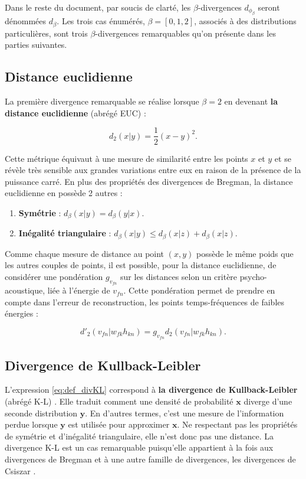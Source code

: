 Dans le reste du document, par soucis de clarté, les $\beta$-divergences $d_{\phi_{\beta}}$ seront dénommées $d_{\beta}$. Les trois cas énumérés, $\beta  = [0,1,2]$, associés à des distributions particulières, sont trois $\beta$-divergences remarquables qu'on présente dans les parties suivantes.

\subsection{Distance euclidienne}
La première divergence remarquable se réalise lorsque $\beta = 2$ en devenant \textbf{la distance euclidienne} (abrégé EUC) :

\begin{equation}
d_{{2}}(x\vert y) = \dfrac{1}{2}(x-y)^2.
\end{equation}

Cette métrique équivaut à une mesure de similarité entre les points $x$ et $y$ et se révèle très sensible aux grandes variations entre eux en raison de la présence de la puissance carré. En plus des propriétés des divergences de Bregman, la distance euclidienne en possède 2 autres :
\begin{enumerate}

\item \textbf{Symétrie} : $d_{\beta}(x \vert y ) = d_{\beta}(y \vert x)$.

\item \textbf{Inégalité triangulaire} : $d_{\beta}(x \vert y ) \leq d_{\beta}(x \vert z ) + d_{\beta}(x \vert z )$.\\
\end{enumerate}

Comme chaque mesure de distance au point $(x,y)$ possède le même poids que les autres couples de points, il est possible, pour la distance euclidienne, de considérer une pondération $g_{v_{fn}}$  sur les distances selon un critère psycho-acoustique, liée à l'énergie de $v_{fn}$. Cette pondération permet de prendre en compte dans l'erreur de reconstruction, les points temps-fréquences de faibles énergies \cite{virtanen2004separation} :

\begin{equation}
d'_2(v_{fn} \vert w_{fk} h_{kn}) = g_{v_{fn}} d_2 (v_{fn} \vert w_{fk} h_{kn}).
\end{equation}

\subsection{Divergence de Kullback-Leibler}
L'expression \ref{eq:def_divKL} correspond à \textbf{la divergence de Kullback-Leibler} (abrégé K-L) \cite{kompass_generalized_2007, cichocki_new_2006} . Elle traduit comment une densité de probabilité $\mathbf{x}$ diverge d'une seconde distribution $\mathbf{y}$. En d'autres termes, c'est une mesure de l'information perdue lorsque $\mathbf{y}$ est utilisée pour approximer $\mathbf{x}$. Ne respectant pas les propriétés de symétrie et d'inégalité triangulaire, elle n'est donc pas une distance. La divergence K-L est un cas remarquable puisqu'elle appartient à la fois aux divergences de Bregman et à une autre famille de divergences, les divergences de Csiszar \cite{cichocki_csiszars_2006}.

